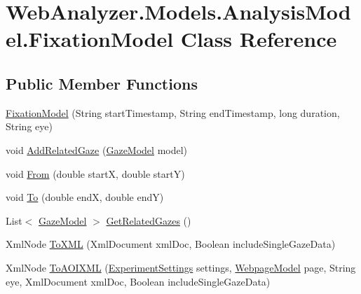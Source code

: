 \hypertarget{class_web_analyzer_1_1_models_1_1_analysis_model_1_1_fixation_model}{}\section{Web\+Analyzer.\+Models.\+Analysis\+Model.\+Fixation\+Model Class Reference}
\label{class_web_analyzer_1_1_models_1_1_analysis_model_1_1_fixation_model}
\subsection*{Public Member Functions}
\begin{DoxyCompactItemize}
\item 
\hyperlink{class_web_analyzer_1_1_models_1_1_analysis_model_1_1_fixation_model_a462b5af1ba7cf2fd227cd570ced6a654}{Fixation\+Model} (String start\+Timestamp, String end\+Timestamp, long duration, String eye)
\item 
void \hyperlink{class_web_analyzer_1_1_models_1_1_analysis_model_1_1_fixation_model_a8960e4d69b3c8782d89af1195220f911}{Add\+Related\+Gaze} (\hyperlink{class_web_analyzer_1_1_models_1_1_data_model_1_1_gaze_model}{Gaze\+Model} model)
\item 
void \hyperlink{class_web_analyzer_1_1_models_1_1_analysis_model_1_1_fixation_model_aa11ed7734ed0da8d4bbb86b89a986a75}{From} (double start\+X, double start\+Y)
\item 
void \hyperlink{class_web_analyzer_1_1_models_1_1_analysis_model_1_1_fixation_model_a3a34442019813f39e6acbbb881017808}{To} (double end\+X, double end\+Y)
\item 
List$<$ \hyperlink{class_web_analyzer_1_1_models_1_1_data_model_1_1_gaze_model}{Gaze\+Model} $>$ \hyperlink{class_web_analyzer_1_1_models_1_1_analysis_model_1_1_fixation_model_afd82114a1c8126e23215962e4cf135f8}{Get\+Related\+Gazes} ()
\item 
Xml\+Node \hyperlink{class_web_analyzer_1_1_models_1_1_analysis_model_1_1_fixation_model_a4f11e23a31e060973c751e67f9a2ff9f}{To\+X\+M\+L} (Xml\+Document xml\+Doc, Boolean include\+Single\+Gaze\+Data)
\item 
Xml\+Node \hyperlink{class_web_analyzer_1_1_models_1_1_analysis_model_1_1_fixation_model_ac235ff98ad7edc4465c7efa9d919630e}{To\+A\+O\+I\+X\+M\+L} (\hyperlink{class_web_analyzer_1_1_models_1_1_settings_model_1_1_experiment_settings}{Experiment\+Settings} settings, \hyperlink{class_web_analyzer_1_1_models_1_1_data_model_1_1_webpage_model}{Webpage\+Model} page, String eye, Xml\+Document xml\+Doc, Boolean include\+Single\+Gaze\+Data)
\end{DoxyCompactItemize}
